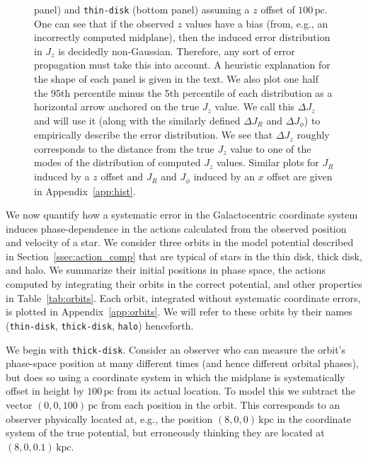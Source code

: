 \documentclass[twocolumn]{aastex62}
\newcommand{\pc}{\text{pc}}
\newcommand{\kpc}{\text{kpc}}
\newcommand{\thin}{\texttt{thin-disk}}
\newcommand{\thick}{\texttt{thick-disk}}
\newcommand{\halo}{\texttt{halo}}
\begin{document}
\begin{figure}
{panel) and \thin{} (bottom panel) assuming a $z$ offset of
$100\,\pc$. One can see that if the observed $z$ values have a bias (from, e.g.,
an incorrectly computed midplane), then the induced error distribution in
$J_z$ is decidedly non-Gaussian. Therefore, any sort of error propagation must
take this into account. 
A heuristic explanation
for the shape of each panel is given in the
text. We also plot one half the 95th percentile minus the 5th
percentile of each distribution as a horizontal arrow anchored on the true
$J_z$ value. We call this $\Delta J_z$ and will use it (along with the
similarly defined $\Delta J_R$ and $\Delta J_{\phi}$) to empirically describe
the error distribution. We see that $\Delta J_z$ roughly corresponds to the
distance from the true $J_z$ value to one of the modes of the distribution of
computed $J_z$ values. Similar plots for $J_R$ induced by a $z$ offset and
$J_R$ and $J_{\phi}$ induced by an $x$ offset are given in
Appendix~\ref{app:hist}.}
\label{fig:Jz_hist}
\end{figure}

We now quantify how a systematic error in the Galactocentric coordinate system
induces phase-dependence in the actions calculated from the observed position and velocity of a star. We consider
three orbits in the model potential described in
Section~\ref{ssec:action_comp} that are typical of stars in the thin
disk, thick disk, and halo. We summarize their initial
positions in phase space, the actions computed by integrating their orbits
in the correct potential, and other properties in Table~\ref{tab:orbits}. Each orbit, integrated
without systematic coordinate errors, is plotted in Appendix~\ref{app:orbits}.
We will refer to these orbits by their names (\thin{}, \thick{}, \halo{})
henceforth.

We begin with \thick{}. Consider an observer who can
measure the orbit's phase-space position at many different times
(and hence different orbital phases), but does so using a
coordinate system in which the midplane is systematically offset in height by
$100\,\pc$ from its actual location. To model this we subtract the vector $(0, 0,
100)\,\pc$ from each position in the orbit. This corresponds to an
observer physically located at, e.g., the position $(8, 0, 0)\,\kpc$ in the
coordinate system of the true potential, but erroneously thinking they are
located at $(8, 0, 0.1)\,\kpc$.
\end{document}
